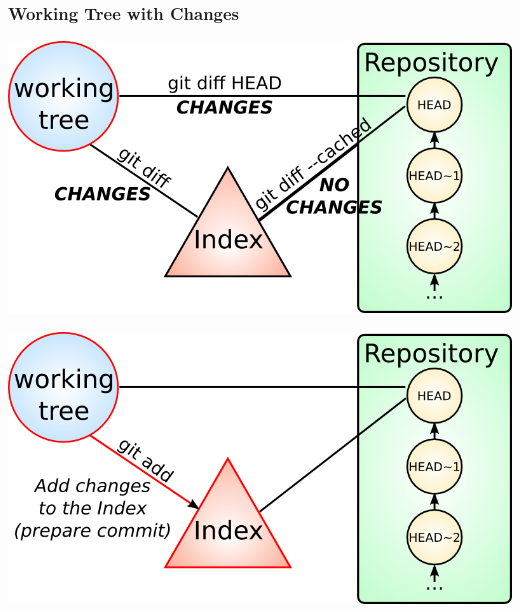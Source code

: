 
\begin{frame}
  \frametitle{Working Tree with Changes}

  \begin{center}
    \includegraphics[width=1.0\textwidth]{images/git-diffs-changes.png}
  \end{center}
\end{frame}


\begin{frame}

  \begin{center}
    \includegraphics[width=1.0\textwidth]{images/git-add.png}
  \end{center}
\end{frame}


